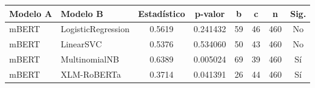 \begin{tabular}{llcccccc}
\toprule
Modelo A & Modelo B & Estadístico & p-valor & b & c & n & Sig. \\
\midrule
mBERT & LogisticRegression & 0.5619 & 0.241432 & 59 & 46 & 460 & No \\
mBERT & LinearSVC & 0.5376 & 0.534060 & 50 & 43 & 460 & No \\
mBERT & MultinomialNB & 0.6389 & 0.005024 & 69 & 39 & 460 & Sí \\
mBERT & XLM-RoBERTa & 0.3714 & 0.041391 & 26 & 44 & 460 & Sí \\
\bottomrule
\end{tabular}
